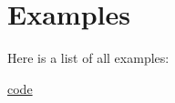 \section{Examples}
Here is a list of all examples\+:\begin{DoxyCompactItemize}
\item 
\hyperlink{code-example}{code}
\end{DoxyCompactItemize}
